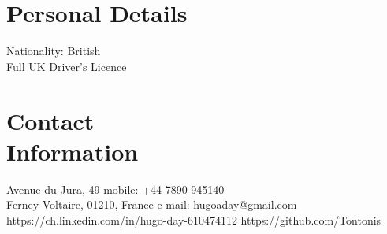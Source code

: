 \documentclass[margin,line]{resume}
\begin{document}
\begin{resume}

    \section{\mysidestyle Personal Details}
    Nationality: British \vspace{0mm}\\\vspace{-4.5mm}%
    Full UK Driver's Licence  \vspace{0mm}\\\vspace{-4.5mm}%


    \section{\mysidestyle Contact\\Information}
    Avenue du Jura, 49                            \hfill mobile: +44 7890 945140          \vspace{0mm}\\\vspace{0mm}%
    Ferney-Voltaire, 01210, France                          \hfill e-mail: hugoaday@gmail.com  \vspace{0mm}\\\vspace{-4.5mm} %
https://ch.linkedin.com/in/hugo-day-610474112    \hfill https://github.com/Tontonis  \vspace{0mm}\\\vspace{-4.5mm}%
\\

%

\end{resume}
\end{document}
